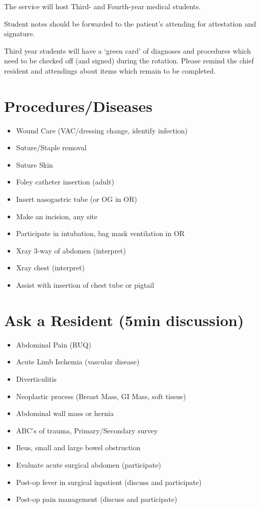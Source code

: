 \documentclass[
]{book}
\providecommand{\tightlist}{%
  \setlength{\itemsep}{0pt}\setlength{\parskip}{0pt}}
\begin{document}
The service will host Third- and Fourth-year medical students.

Student notes should be forwarded to the patient's attending for attestation and signature.

Third year students will have a `green card' of diagnoses and procedures which need to be checked off (and signed) during the rotation. Please remind the chief resident and attendings about items which remain to be completed.

\hypertarget{proceduresdiseases}{%
\section{Procedures/Diseases}\label{proceduresdiseases}}

\begin{itemize}
\tightlist
\item
  Wound Care (VAC/dressing change, identify infection)
\item
  Suture/Staple removal
\item
  Suture Skin
\item
  Foley catheter insertion (adult)
\item
  Insert nasogastric tube (or OG in OR)
\item
  Make an incision, any site
\item
  Participate in intubation, bag mask ventilation in OR
\item
  Xray 3-way of abdomen (interpret)
\item
  Xray chest (interpret)
\item
  Assist with insertion of chest tube or pigtail
\end{itemize}

\hypertarget{ask-a-resident-5min-discussion}{%
\section{Ask a Resident (5min discussion)}\label{ask-a-resident-5min-discussion}}

\begin{itemize}
\tightlist
\item
  Abdominal Pain (RUQ)
\item
  Acute Limb Ischemia (vascular disease)
\item
  Diverticulitis
\item
  Neoplastic process (Breast Mass, GI Mass, soft tissue)
\item
  Abdominal wall mass or hernia
\item
  ABC's of trauma, Primary/Secondary survey
\item
  Ileus, small and large bowel obstruction
\item
  Evaluate acute surgical abdomen (participate)
\item
  Post-op fever in surgical inpatient (discuss and participate)
\item
  Post-op pain management (discuss and participate)
\end{itemize}
\end{document}
